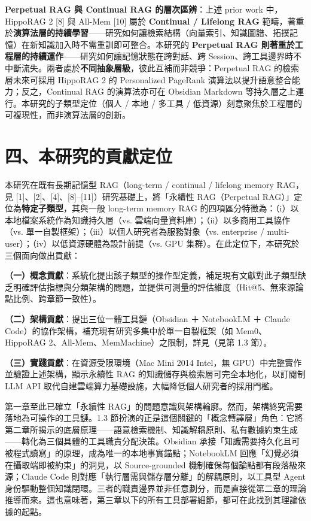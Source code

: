 \textbf{Perpetual RAG 與 Continual RAG 的層次區辨}：上述 prior work 中，HippoRAG 2 {[}8{]} 與 All-Mem {[}10{]} 屬於 \textbf{Continual / Lifelong RAG}
範疇，著重於\textbf{演算法層的持續學習}------研究如何讓檢索結構（向量索引、知識圖譜、拓撲記憶）在新知識加入時不需重訓即可整合。本研究的
\textbf{Perpetual RAG 則著重於工程層的持續運作}------研究如何讓記憶狀態在跨對話、跨 Session、跨工具邊界時不中斷流失。兩者處於\textbf{不同抽象層級}，彼此互補而非競爭：Perpetual RAG 的檢索層未來可採用 HippoRAG 2 的 Personalized PageRank 演算法以提升語意整合能力；反之，Continual RAG 的演算法亦可在 Obsidian Markdown 等持久層之上運行。本研究的子類型定位（個人 / 本地 / 多工具 / 低資源）刻意聚焦於工程層的可複現性，而非演算法層的創新。

\section{四、本研究的貢獻定位}\label{ux56dbux672cux7814ux7a76ux7684ux8ca2ux737bux5b9aux4f4d}

本研究在既有長期記憶型 RAG（long-term / continual / lifelong memory
RAG，見 {[}1{]}、{[}2{]}、{[}4{]}、{[}8{]}--{[}11{]}）研究基礎上，將「永續性
RAG（Perpetual RAG）」定位為\textbf{特定子類型}，其與一般 long-term
memory RAG
的四項區分特徵為：（i）以本地檔案系統作為知識持久層（vs. 雲端向量資料庫）；（ii）以多商用工具協作（vs. 單一自製框架）；（iii）以個人研究者為服務對象（vs. enterprise / multi-user）；（iv）以低資源硬體為設計前提（vs. GPU 集群）。在此定位下，本研究於三個面向做出貢獻：

\textbf{（一）概念貢獻}：系統化提出該子類型的操作型定義，補足現有文獻對此子類型缺乏明確評估指標與分類架構的問題，並提供可測量的評估維度（Hit@5、無來源論點比例、跨章節一致性）。

\textbf{（二）架構貢獻}：提出三位一體工具鏈（Obsidian ＋ NotebookLM ＋
Claude Code）的協作架構，補充現有研究多集中於單一自製框架（如
Mem0、HippoRAG 2、All-Mem、MemMachine）之限制，詳見（見第 1.3 節）。

\textbf{（三）實踐貢獻}：在資源受限環境（Mac Mini 2014 Intel，無
GPU）中完整實作並驗證上述架構，顯示永續性 RAG
的知識儲存與檢索層可完全本地化，以訂閱制 LLM API
取代自建雲端算力基礎設施，大幅降低個人研究者的採用門檻。

第一章至此已確立「永續性
RAG」的問題意識與架構輪廓。然而，架構終究需要落地為可操作的工具鏈。1.3
節扮演的正是這個關鍵的「概念轉譯層」角色：它將第二章所揭示的底層原理------語意檢索機制、知識解耦原則、私有數據約束生成------轉化為三個具體的工具職責分配決策。Obsidian
承接「知識需要持久化且可被程式讀寫」的原理，成為唯一的本地事實錨點；NotebookLM
回應「幻覺必須在攝取端即被約束」的洞見，以 Source-grounded
機制確保每個論點都有段落級來源；Claude Code
則對應「執行層需與儲存層分離」的解耦原則，以工具型 Agent
身份驅動整個知識閉環。三者的職責邊界並非任意劃分，而是直接從第二章的理論推導而來。這也意味著，第三章以下的所有工具部署細節，都可在此找到其理論依據的起點。

